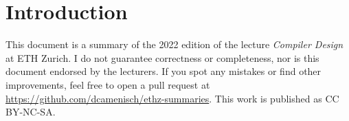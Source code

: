 \section{Introduction}

This document is a summary of the 2022 edition of the lecture \textit{Compiler Design} at ETH Zurich. I do not guarantee correctness or completeness, nor is this document endorsed by the lecturers. If you spot any mistakes or find other improvements, feel free to open a pull request at \url{https://github.com/dcamenisch/ethz-summaries}. This work is published as CC BY-NC-SA.
\begin{center}
	\ccbyncsa
\end{center}

